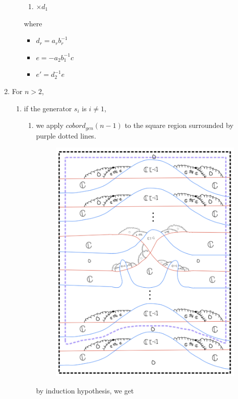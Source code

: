 \begin{enumerate}[label = (\roman*)]
\begin{enumerate}[label = (Step \arabic*)]
\begin{enumerate}[label = (\arabic*)]
\item $\times d_1$
\end{enumerate}
where
\begin{itemize}
\item $d_r = a_rb_r^{-1}$
\item $e = -a_2b_1^{-1}c$
\item $e' = d_2^{-1}e$
\end{itemize}
\end{enumerate}
\pagebreak
\item For $n>2$,
\begin{enumerate}[label = (Case \arabic*)]
\item if the generator $s_i$ is $i\neq 1$,
\begin{enumerate}[label = (Step \arabic*)]
\item we apply $cobord_{gen}(n-1)$ to the square region surrounded by purple dotted lines.

\begin{figure}[H]
    \centering
    \includegraphics[scale = 0.95]{diagrams/cobord_gen/2.png}
    \caption{}
    \label{fig:your-label}
\end{figure}
\pagebreak
by induction hypothesis, we get


\end{enumerate}
\end{enumerate}
\end{enumerate}
